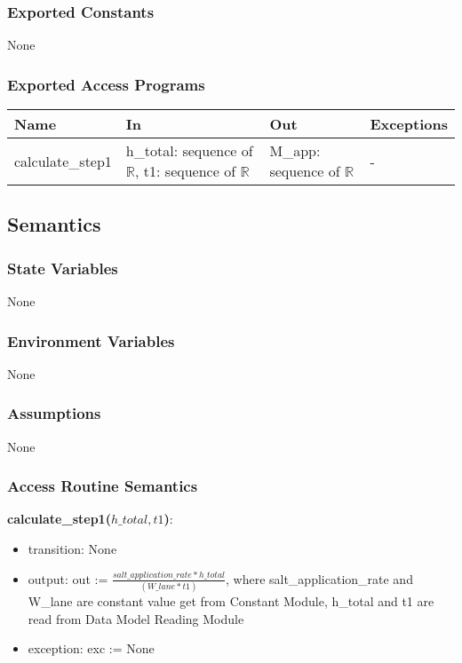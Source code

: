 \documentclass[12pt, titlepage]{article}
\begin{document}
\subsubsection{Exported Constants}
None
\subsubsection{Exported Access Programs}

\begin{center}
\begin{tabular}{p{2.5cm} p{4.5cm} p{4.5cm} p{2cm}}
\hline
\textbf{Name} & \textbf{In} & \textbf{Out} & \textbf{Exceptions} \\
\hline
calculate\_step1 & h\_total: sequence of $\mathbb{R}$, t1: sequence of $\mathbb{R}$ & M\_app: sequence of $\mathbb{R}$ & - \\
\hline
\end{tabular}
\end{center}

\subsection{Semantics}

\subsubsection{State Variables}
None
\subsubsection{Environment Variables}
None
\subsubsection{Assumptions}
None
\subsubsection{Access Routine Semantics}
\noindent \textbf{calculate\_step1($h\_total, t1$)}:
\begin{itemize}
\item transition: None
\item output: out :=  $\frac{salt\_application\_rate*h\_total}{ (W\_lane*t1)}$, where salt\_application\_rate and W\_lane are constant value get from Constant Module, h\_total and t1 are read from Data Model Reading Module
\item exception: exc := None
\end{itemize}
\end{document}
